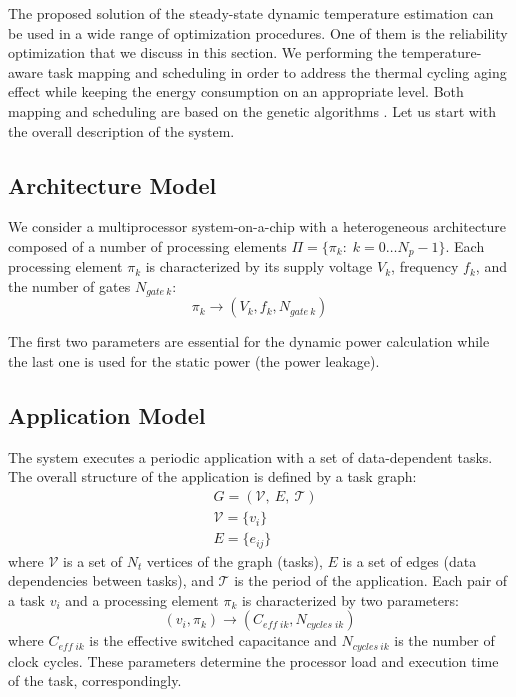 The proposed solution of the steady-state dynamic temperature estimation can be used in a wide range of optimization procedures. One of them is the reliability optimization that we discuss in this section. We performing the temperature-aware task mapping and scheduling in order to address the thermal cycling aging effect while keeping the energy consumption on an appropriate level. Both mapping and scheduling are based on the genetic algorithms \cite{schmitz2004}. Let us start with the overall description of the system.

\subsection{Architecture Model}
We consider a multiprocessor system-on-a-chip with a heterogeneous architecture composed of a number of processing elements $\Pi = \{ \pi_k: \; k = 0 \dots N_p - 1 \}$. Each processing element $\pi_k$ is characterized by its supply voltage $V_k$, frequency $f_k$, and the number of gates $N_{gate \: k}$:
\[
  \pi_k \rightarrow (V_k, f_k, N_{gate \: k})
\]

The first two parameters are essential for the dynamic power calculation while the last one is used for the static power (the power leakage).

\subsection{Application Model}
The system executes a periodic application with a set of data-dependent tasks. The overall structure of the application is defined by a task graph:
\begin{align*}
  & G = (\mathcal{V}, \: E, \: \mathcal{T}) \\
  & \mathcal{V} = \{ v_i \} \\
  & E = \{ e_{ij} \}
\end{align*}
where $\mathcal{V}$ is a set of $N_t$ vertices of the graph (tasks), $E$ is a set of edges (data dependencies between tasks), and $\mathcal{T}$ is the period of the application. Each pair of a task $v_i$ and a processing element $\pi_k$ is characterized by two parameters:
\begin{equation*}
  (v_i, \pi_k) \rightarrow (C_{eff \; ik}, N_{cycles \; ik})
\end{equation*}
where $C_{eff \; ik}$ is the effective switched capacitance and $N_{cycles \: ik}$ is the number of clock cycles. These parameters determine the processor load and execution time of the task, correspondingly.

